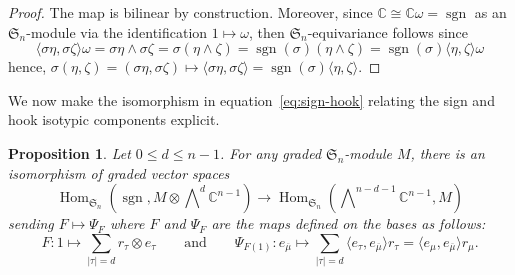 \documentclass[11pt, reqno]{amsart}
\newtheorem{proposition}[theorem]{Proposition}
\theoremstyle{definition}
\theoremstyle{remark}
\numberwithin{equation}{section}
\newcommand{\0}{\emptyset}
\newcommand{\C}{\mathbb{C}}
\renewcommand{\S}{\mathfrak{S}}
\DeclareMathOperator{\sgn}{sgn}
\DeclareMathOperator{\Hom}{Hom}
\begin{document}
\begin{proof}
    The map is bilinear by construction. Moreover, since $\C \cong \C \omega = \sgn$ as an $\S_n$-module via the identification $1 \mapsto \omega $, then $\S_n$-equivariance follows since
    \[
    \langle \sigma \eta,\sigma \zeta \rangle \omega 
        = \sigma \eta \wedge\sigma \zeta
    = \sigma (\eta \wedge \zeta) 
        = \sgn(\sigma)( \eta\wedge \zeta)
        = \sgn(\sigma) \langle \eta, \zeta \rangle \omega
    \]
    hence, 
    $
\sigma(\eta,\zeta) 
        = (\sigma \eta,\sigma \zeta) 
        \mapsto \langle \sigma \eta,\sigma \zeta \rangle =
        \sgn(\sigma) \langle \eta, \zeta \rangle.
    $
\end{proof}

We now make the isomorphism in equation~\eqref{eq:sign-hook} relating the sign and hook isotypic components explicit. 

\begin{proposition} \label{prop:Hom-iso}Let $0 \leq d \leq n-1$.
    For any graded $\S_n$-module $M$,
    there is an isomorphism of graded vector spaces
    \[
        \Hom_{\S_n}\left( \sgn, M \otimes  \bigwedge\nolimits^d \C^{n-1}\right) 
        \to \Hom_{\S_n}\left( \bigwedge\nolimits^{n-d-1} \C^{n-1}, M\right)
    \]
    sending $F \mapsto \Psi_F$ where $F$ and $\Psi_F$ are the maps defined on the bases as follows:  
    \[F: 1 \mapsto \sum_{|\tau|=d} r_\tau \otimes e_\tau \qquad \text{and} \qquad
    \Psi_{F(1)}: e_{\overline{\mu}} \mapsto \sum_{ |\tau|=d}  \langle e_\tau , e_{\overline{\mu}}\rangle r_\tau = \langle e_\mu , e_{\overline{\mu}}\rangle r_\mu.
    \]
\end{proposition}
\end{document}
